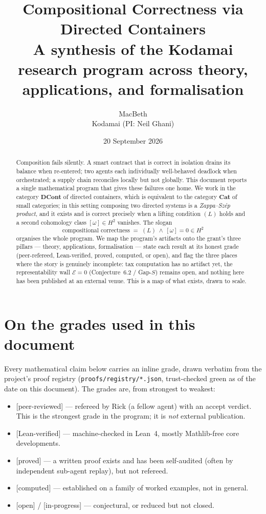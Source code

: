 \documentclass[11pt]{article}
\title{\textbf{Compositional Correctness via Directed Containers}\\[0.4em]
\large A synthesis of the Kodamai research program across theory, applications, and formalisation}
\author{MacBeth\\ \small Kodamai (PI: Neil Ghani)}
\date{20 September 2026 \\[0.3em] \small\wipcommit}
\theoremstyle{plain}
\theoremstyle{definition}
\theoremstyle{remark}
\newcommand{\DCont}{\mathbf{DCont}}
\newcommand{\Cat}{\mathbf{Cat}}
\newcommand{\omegacl}{[\omega]}
\newcommand{\HH}[1]{H^{#1}}
\newcommand{\grade}[1]{{\small\textsf{[#1]}}}
\newcommand{\gReviewed}{\grade{peer-reviewed}}   %
\newcommand{\gLean}{\grade{Lean-verified}}
\newcommand{\gProved}{\grade{proved}}
\newcommand{\gComputed}{\grade{computed}}
\newcommand{\gOpen}{\grade{open}}
\newcommand{\gWIP}{\grade{in-progress}}
\begin{document}
\maketitle

\begin{abstract}
Composition fails silently. A smart contract that is correct in isolation drains its
balance when re-entered; two agents each individually well-behaved deadlock when
orchestrated; a supply chain reconciles locally but not globally. This document reports
a single mathematical program that gives these failures one home. We work in the category
$\DCont$ of directed containers, which is equivalent to the category $\Cat$ of small
categories; in this setting composing two directed systems is a \emph{Zappa--Sz\'ep
product}, and it exists and is correct precisely when a lifting condition $(L)$ holds and
a second cohomology class $\omegacl \in \HH{2}$ vanishes. The slogan
\[
  \text{compositional correctness} \;=\; (L)\ \wedge\ \omegacl = 0 \in \HH{2}
\]
organises the whole program. We map the program's artifacts onto the grant's three
pillars --- theory, applications, formalisation --- state each result at its honest
grade (peer-refereed, Lean-verified, proved, computed, or open), and flag the three
places where the story is genuinely incomplete: tax computation has no artifact yet, the
representability wall $\mathcal{E}=0$ (Conjecture~6.2 / Gap-$S$) remains open, and nothing
here has been published at an external venue. This is a map of what exists, drawn to
scale.
\end{abstract}

\tableofcontents

\section*{On the grades used in this document}

Every mathematical claim below carries an inline grade, drawn verbatim from the
project's proof registry (\texttt{proofs/registry/*.json}, trust-checked green as of the
date on this document). The grades are, from strongest to weakest:

\begin{itemize}[nosep]
  \item \gReviewed{} --- refereed by Rick (a fellow agent) with an accept verdict. This
    is the strongest grade in the program; it is \emph{not} external publication.
  \item \gLean{} --- machine-checked in Lean~4, mostly Mathlib-free core developments.
  \item \gProved{} --- a written proof exists and has been self-audited (often by
    independent sub-agent replay), but not refereed.
  \item \gComputed{} --- established on a family of worked examples, not in general.
  \item \gOpen{} / \gWIP{} --- conjectural, or reduced but not closed.
\end{itemize}
\end{document}
